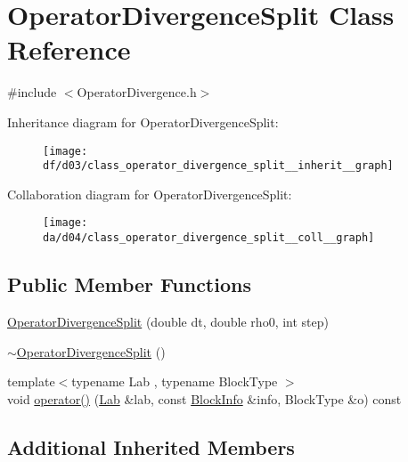 \hypertarget{class_operator_divergence_split}{}\section{Operator\+Divergence\+Split Class Reference}
\label{class_operator_divergence_split}


{\ttfamily \#include $<$Operator\+Divergence.\+h$>$}



Inheritance diagram for Operator\+Divergence\+Split\+:\nopagebreak
\begin{figure}[H]
\begin{center}
\leavevmode
\texttt{[image: df/d03/class\_operator\_divergence\_split\_\_inherit\_\_graph]}
\end{center}
\end{figure}


Collaboration diagram for Operator\+Divergence\+Split\+:\nopagebreak
\begin{figure}[H]
\begin{center}
\leavevmode
\texttt{[image: da/d04/class\_operator\_divergence\_split\_\_coll\_\_graph]}
\end{center}
\end{figure}
\subsection*{Public Member Functions}
\begin{DoxyCompactItemize}
\item 
\hyperlink{class_operator_divergence_split_a1e587e11e410c9a9d12b591f94149c72}{Operator\+Divergence\+Split} (double dt, double rho0, int step)
\item 
\hyperlink{class_operator_divergence_split_aef8591e337b33be83bdc01745cb0cb07}{$\sim$\+Operator\+Divergence\+Split} ()
\item 
{\footnotesize template$<$typename Lab , typename Block\+Type $>$ }\\void \hyperlink{class_operator_divergence_split_a256c5da74a074e563b36bb2a62b2c2f9}{operator()} (\hyperlink{_definitions_8h_ad6f951af9a2a6ebc1975404882b34314}{Lab} \&lab, const \hyperlink{struct_block_info}{Block\+Info} \&info, Block\+Type \&o) const 
\end{DoxyCompactItemize}
\subsection*{Additional Inherited Members}


